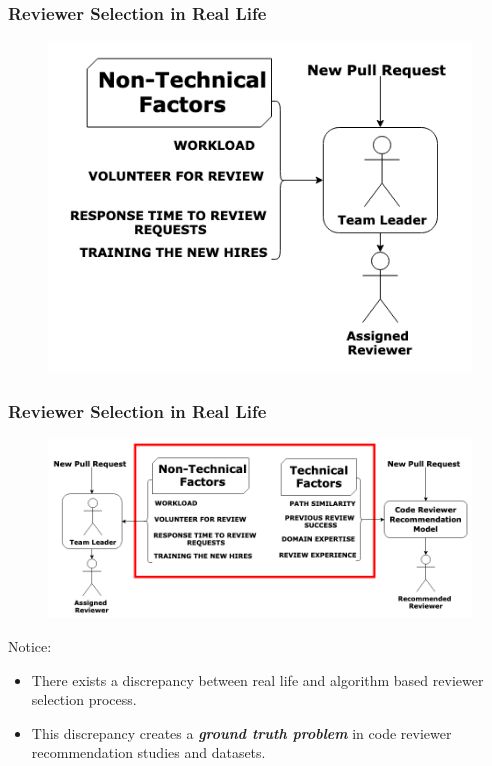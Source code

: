 \documentclass{beamer}
\begin{document}
\begin{frame}
\frametitle{\large Reviewer Selection in Real Life }

  \begin{figure}
    \includegraphics[scale=0.47]{img/real-life.png}
    \end{figure}

\end{frame}

\begin{frame}
\frametitle{\large Reviewer Selection in Real Life }

  \begin{figure}
    \includegraphics[scale=0.31]{img/final-.png}
    \end{figure}
    \begin{alertblock}{Notice:}
        \begin{itemize}
        \item There exists a discrepancy between real life and algorithm based reviewer selection process.
        \item This discrepancy creates a \textbf{\textit{ground truth problem}} in code reviewer recommendation studies and datasets.
        \end{itemize}
    \end{alertblock}
\end{frame}
\end{document}
